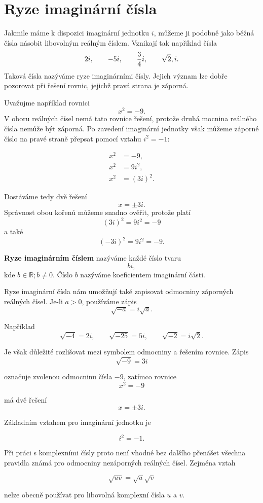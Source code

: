 \documentclass[12pt,a4paper]{article}
\begin{document}
\section{Ryze imaginární čísla}
Jakmile máme k dispozici imaginární jednotku $i$, můžeme ji podobně jako běžná
čísla násobit libovolným reálným číslem. Vznikají tak například čísla
\[
    2i,
    \qquad
    -5i,
    \qquad
    \frac{3}{4}i,
    \qquad
    \sqrt{2}\\,i.
\]
Taková čísla nazýváme ryze imaginárními čísly. Jejich význam lze dobře
pozorovat při řešení rovnic, jejichž pravá strana je záporná.

Uvažujme například rovnici
\[
    x^2=-9.
\]
V oboru reálných čísel nemá tato rovnice řešení, protože druhá mocnina reálného
čísla nemůže být záporná. Po zavedení imaginární jednotky však můžeme záporné
číslo na pravé straně přepsat pomocí vztahu $i^2=-1$:

\begin{align*}
    x^2 &= -9,\\
    x^2 &= 9i^2,\\
    x^2 &= (3i)^2.
\end{align*}

Dostáváme tedy dvě řešení
\[
    x=\pm3i.
\]
Správnost obou kořenů můžeme snadno ověřit, protože platí
\[
    (3i)^2=9i^2=-9
\]
a také
\[
    (-3i)^2=9i^2=-9.
\]

\begin{definitionbox}
    \textbf{Ryze imaginárním číslem} nazýváme každé číslo tvaru
    \[
        bi, 
    \]
    kde $b\in\mathbb{R}; b\neq0$.
    Číslo \(b\) nazýváme koeficientem imaginární části.
\end{definitionbox}

Ryze imaginární čísla nám umožňují také zapisovat odmocniny záporných reálných
čísel. Je-li $a>0$, používáme zápis
\[
    \sqrt{-a}=i\sqrt{a}.
\]

Například
\[
    \sqrt{-4}=2i,
    \qquad
    \sqrt{-25}=5i,
    \qquad
    \sqrt{-2}=i\sqrt{2}.
\]

Je však důležité rozlišovat mezi symbolem odmocniny a řešením rovnice. Zápis
\[
    \sqrt{-9}=3i
\]

označuje zvolenou odmocninu čísla $-9$, zatímco rovnice
\[
    x^2=-9
\]

má dvě řešení
\[
    x=\pm3i.
\]

\begin{notebox}

Základním vztahem pro imaginární jednotku je

\[
    i^2=-1.
\]

Při práci s komplexními čísly proto není vhodné bez dalšího přenášet všechna
pravidla známá pro odmocniny nezáporných reálných čísel. Zejména vztah

\[
    \sqrt{uv}=\sqrt{u}\sqrt{v}
\]

nelze obecně používat pro libovolná komplexní čísla $u$ a $v$.
\end{notebox}
\end{document}
